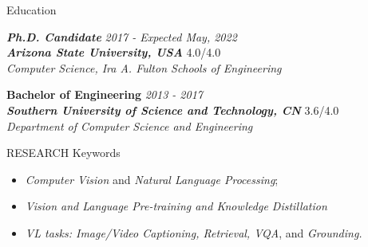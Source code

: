 \documentclass{resume} %
\begin{document}

\begin{rSection}{Education}

\textit{{\bf Ph.D. Candidate }} \hfill {\em 2017 - Expected May, 2022} 
\\
{\textit{\bf Arizona State University, USA}} \hfill 4.0/4.0
\\ \textit{Computer Science, Ira A. Fulton Schools of Engineering
}

\vspace{-3mm}
\vspace{-3mm}

{\bf Bachelor of Engineering} \hfill {\em 2013 - 2017} 
\\  \textit{\bf Southern University of Science and Technology, CN} \hfill 3.6/4.0
\\ \textit{Department of Computer Science and Engineering}

\end{rSection}

\begin{rSection}{RESEARCH Keywords}
   \begin{itemize}
   \itemsep-0.4em 
    \item \textit{Computer Vision} and \textit{Natural Language Processing};
    \item \textit{Vision and Language Pre-training and Knowledge Distillation}
    \item \textit{VL tasks: Image/Video Captioning, Retrieval, VQA}, and \textit{Grounding.}

    \end{itemize}
\end{rSection}
\end{document}
